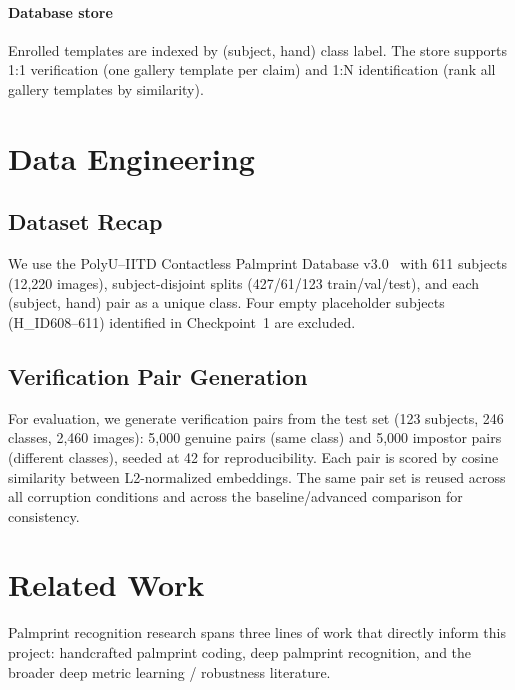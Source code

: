 \documentclass[conference]{IEEEtran}
\begin{document}
\paragraph{Database store}
Enrolled templates are indexed by (subject, hand) class label. The store supports 1:1 verification (one gallery template per claim) and 1:N identification (rank all gallery templates by similarity).

\section{Data Engineering}

\subsection{Dataset Recap}
We use the PolyU--IITD Contactless Palmprint Database v3.0~\cite{polyu} with 611 subjects (12{,}220 images), subject-disjoint splits (427/61/123 train/val/test), and each (subject, hand) pair as a unique class. Four empty placeholder subjects (H\_ID608--611) identified in Checkpoint~1 are excluded.

\subsection{Verification Pair Generation}
For evaluation, we generate verification pairs from the test set (123 subjects, 246 classes, 2{,}460 images): 5{,}000 genuine pairs (same class) and 5{,}000 impostor pairs (different classes), seeded at 42 for reproducibility. Each pair is scored by cosine similarity between L2-normalized embeddings. The same pair set is reused across all corruption conditions and across the baseline/advanced comparison for consistency.

\section{Related Work}
\label{sec:related}

Palmprint recognition research spans three lines of work that directly inform this project: handcrafted palmprint coding, deep palmprint recognition, and the broader deep metric learning / robustness literature.
\end{document}

